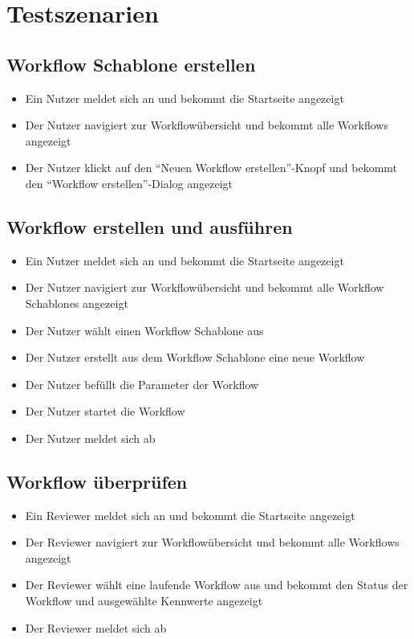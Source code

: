 \section{Testszenarien}

\subsection*{\gls{Workflow Schablone} erstellen}
\begin{itemize}
    \item Ein \Gls{Nutzer} meldet sich an und bekommt die Startseite angezeigt
    \item Der \Gls{Nutzer} navigiert zur Workflowübersicht und bekommt alle Workflows angezeigt
    \item Der \gls{Nutzer} klickt auf den \enquote{Neuen Workflow erstellen}-Knopf und bekommt den \enquote{Workflow erstellen}-Dialog angezeigt
\end{itemize}

\subsection*{\gls{Workflow} erstellen und ausführen}
\begin{itemize}
    \item Ein \Gls{Nutzer} meldet sich an und bekommt die Startseite angezeigt
    \item Der \Gls{Nutzer} navigiert zur Workflowübersicht und bekommt alle \glspl{Workflow Schablone} angezeigt
    \item Der \gls{Nutzer} wählt einen \gls{Workflow Schablone} aus
    \item Der \gls{Nutzer} erstellt aus dem \gls{Workflow Schablone} eine neue \gls{Workflow} 
    \item Der \gls{Nutzer} befüllt die Parameter der \gls{Workflow}
    \item Der \gls{Nutzer} startet die \gls{Workflow}
    \item Der \gls{Nutzer} meldet sich ab
\end{itemize}

\newpage
\subsection*{\gls{Workflow} überprüfen}
\begin{itemize}
    \item Ein \Gls{Reviewer} meldet sich an und bekommt die Startseite angezeigt
    \item Der \Gls{Reviewer} navigiert zur Workflowübersicht und bekommt alle \glspl{Workflow} angezeigt
    \item Der \Gls{Reviewer} wählt eine laufende \gls{Workflow} aus und bekommt den Status der \gls{Workflow} und ausgewählte Kennwerte angezeigt
    \item Der \gls{Reviewer} meldet sich ab
\end{itemize}


